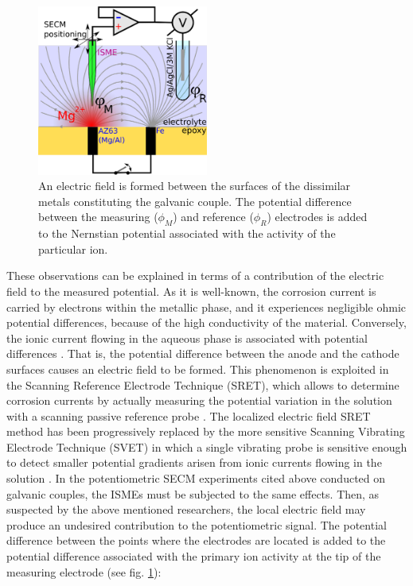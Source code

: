 \documentclass[3p]{elsarticle}
\begin{document}
\begin{figure}
\centering
\includegraphics[width=0.5\textwidth]{abstract.eps}
\caption{An electric field is formed between the surfaces of the dissimilar metals constituting the galvanic couple. The potential difference between the measuring ($\phi_M$) and reference ($\phi_R$) electrodes is added to the Nernstian potential associated with the activity of the particular ion.}
\label{fig:abstract}
\end{figure}

These observations can be explained in terms of a contribution of the electric field to the measured potential. As it is well-known, the corrosion current is carried by electrons within the metallic phase, and it experiences negligible ohmic potential differences, because of the high conductivity of the material. Conversely, the ionic current flowing in the aqueous phase is associated with potential differences \cite{Isaacsfield}. 
That is, the potential difference between the anode and the cathode surfaces causes an electric field to be formed. 
This phenomenon is exploited in the Scanning Reference Electrode Technique (SRET), which allows to determine corrosion currents by actually measuring the potential variation in the solution with a scanning passive reference probe \cite{SRET1, SRET2, SRET3, SRET4}. 
The localized electric field SRET method has been progressively replaced by the more sensitive Scanning Vibrating Electrode Technique (SVET) in which a single vibrating probe is sensitive enough to detect smaller potential gradients arisen from ionic currents flowing in the solution \cite{SVET}. 
In the potentiometric SECM experiments cited above conducted on galvanic couples, the ISMEs must be subjected to the same effects. Then, as suspected by the above mentioned researchers, the local electric field may produce an undesired contribution to the potentiometric signal. 
The potential difference between the points where the electrodes are located is added to the potential difference associated with the primary ion activity at the tip of the measuring electrode (see fig. \ref{fig:abstract}):
\end{document}
